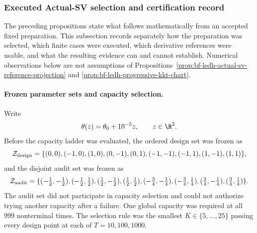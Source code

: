 \subsubsection{Executed Actual-SV selection and certification record}
\label{sec:bf-ledh-actual-sv-overcomplete-certification}

The preceding propositions state what follows mathematically from an accepted
fixed preparation.  This subsection records separately how the preparation was
selected, which finite cases were executed, which derivative references were
usable, and what the resulting evidence can and cannot establish.  Numerical
observations below are not assumptions of
Propositions~\ref{prop:bf-ledh-actual-sv-reference-projection} and
\ref{prop:bf-ledh-progressive-kkt-chart}.

\paragraph{Frozen parameter sets and capacity selection.}
Write
\[
  \theta(z)=\theta_0+10^{-5}z,
  \qquad z\in\R^2.
\]
Before the capacity ladder was evaluated, the ordered design set was frozen as
\begin{equation}
\label{eq:bf-ledh-actual-sv-design-set}
 \mathcal Z_{\rm design}
 =\{(0,0),(-1,0),(1,0),(0,-1),(0,1),
      (-1,-1),(-1,1),(1,-1),(1,1)\},
\end{equation}
and the disjoint audit set was frozen as
\begin{equation}
\label{eq:bf-ledh-actual-sv-heldout-set}
 \mathcal Z_{\rm audit}
 =\{(-\tfrac12,-\tfrac12),(-\tfrac12,\tfrac12),
      (\tfrac12,-\tfrac12),(\tfrac12,\tfrac12),
      (-\tfrac34,-\tfrac14),(-\tfrac34,\tfrac14),
      (\tfrac34,-\tfrac14),(\tfrac34,\tfrac14)\}.
\end{equation}
The audit set did not participate in capacity selection and could not authorize
trying another capacity after a failure.  One global capacity was required at
all \(999\) nonterminal times.  The selection rule was the smallest
\(K\in\{5,\ldots,25\}\) passing every design point at each of
\(T=10,100,1000\).

\begin{table}[H]
\centering
\caption{Frozen Actual-SV anchor-capacity ladder.  A failure is classified by
the first mathematical preparation gate it violates, not by timeout.}
\label{tab:bf-ledh-actual-sv-capacity-ladder}
\end{table}

